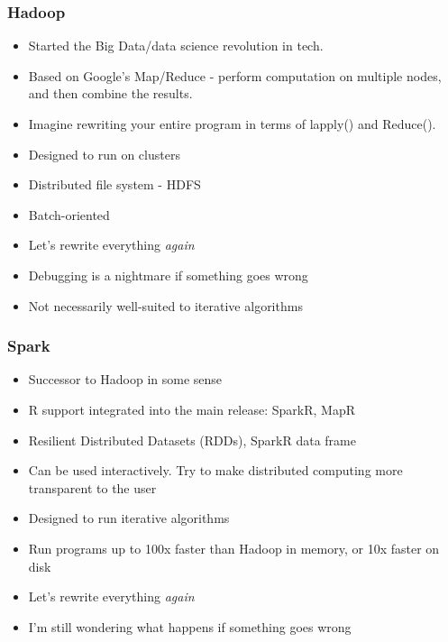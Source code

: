 \documentclass{beamer}
\begin{document}
\begin{frame}
\frametitle{Hadoop}
\begin{itemize}
\item Started the Big Data/data science revolution in tech.
\item Based on Google's Map/Reduce - perform computation on multiple nodes, and then combine
			the results.
\item Imagine rewriting your entire program in terms of lapply() and Reduce().
\item Designed to run on clusters
\item Distributed file system - HDFS
\item Batch-oriented
\item Let's rewrite everything \emph{again}
\item Debugging is a nightmare if something goes wrong
\item Not necessarily well-suited to iterative algorithms
\end{itemize}
\end{frame}

\begin{frame}
\frametitle{Spark}
\begin{itemize}
\item Successor to Hadoop in some sense
\item R support integrated into the main release: SparkR, MapR
\item Resilient Distributed Datasets (RDDs), SparkR data frame
\item Can be used interactively. Try to make distributed computing more
			transparent to the user
\item Designed to run iterative algorithms
\item Run programs up to 100x faster than Hadoop in memory, or 10x faster on disk
\item Let's rewrite everything \emph{again}
\item I'm still wondering what happens if something goes wrong
\end{itemize}
\end{frame}
\end{document}
